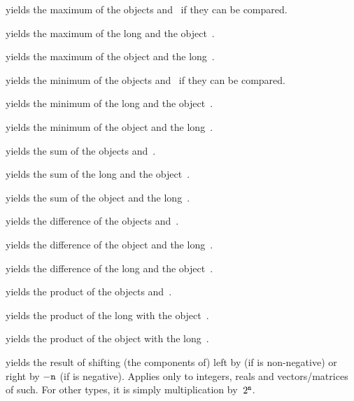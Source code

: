 
 yields the maximum of the objects
 and~ if they can be compared.

 yields the maximum of the long
 and the object~.

 yields the maximum of the object
 and the long~.

 yields the minimum of the objects
 and~ if they can be compared.

 yields the minimum of the long
 and the object~.

 yields the minimum of the object
 and the long~.

 yields the sum of the objects 
and~.

 yields the sum of the long 
and the object~.

 yields the sum of the object
 and the long~.

 yields the difference of the objects
 and~.

 yields the difference of the
object  and the long~.

 yields the difference of the
long  and the object~.

 yields the product of the objects
 and~.

 yields the product of the long
 with the object~.

 yields the product of the object
 with the long~.

 yields the result of shifting
(the components of)  left by  (if  is non-negative)
or right by $-{\tt n}$ (if  is negative).
Applies only to integers, reals and vectors/matrices of such. For other
types, it is simply multiplication by~$2^{{\tt n}}$.

